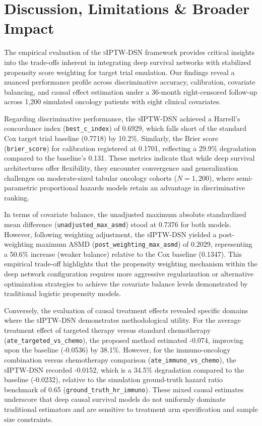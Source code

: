 \documentclass[10pt,twocolumn]{article}
\newenvironment{discussion}{\par\medskip}{\par\medskip}
\begin{document}
\section{Discussion, Limitations \& Broader Impact}
\begin{discussion}
The empirical evaluation of the \textsc{sIPTW-DSN} framework provides critical insights into the trade-offs inherent in integrating deep survival networks with stabilized propensity score weighting for target trial emulation. Our findings reveal a nuanced performance profile across discriminative accuracy, calibration, covariate balancing, and causal effect estimation under a 36-month right-censored follow-up across 1,200 simulated oncology patients with eight clinical covariates.

Regarding discriminative performance, the \textsc{sIPTW-DSN} achieved a Harrell's concordance index (\texttt{best\_c\_index}) of 0.6929, which falls short of the standard Cox target trial baseline (0.7718) by 10.2\%. Similarly, the Brier score (\texttt{brier\_score}) for calibration registered at 0.1701, reflecting a 29.9\% degradation compared to the baseline's 0.131. These metrics indicate that while deep survival architectures offer flexibility, they encounter convergence and generalization challenges on moderate-sized tabular oncology cohorts ($N = 1,200$), where semi-parametric proportional hazards models retain an advantage in discriminative ranking.

In terms of covariate balance, the unadjusted maximum absolute standardized mean difference (\texttt{unadjusted\_max\_asmd}) stood at 0.7376 for both models. However, following weighting adjustment, the \textsc{sIPTW-DSN} yielded a post-weighting maximum ASMD (\texttt{post\_weighting\_max\_asmd}) of 0.2029, representing a 50.6\% increase (weaker balance) relative to the Cox baseline (0.1347). This empirical trade-off highlights that the propensity weighting mechanism within the deep network configuration requires more aggressive regularization or alternative optimization strategies to achieve the covariate balance levels demonstrated by traditional logistic propensity models.

Conversely, the evaluation of causal treatment effects revealed specific domains where the \textsc{sIPTW-DSN} demonstrates methodological utility. For the average treatment effect of targeted therapy versus standard chemotherapy (\texttt{ate\_targeted\_vs\_chemo}), the proposed method estimated -0.074, improving upon the baseline (-0.0536) by 38.1\%. However, for the immuno-oncology combination versus chemotherapy comparison (\texttt{ate\_immuno\_vs\_chemo}), the \textsc{sIPTW-DSN} recorded -0.0152, which is a 34.5\% degradation compared to the baseline (-0.0232), relative to the simulation ground-truth hazard ratio benchmark of 0.65 (\texttt{ground\_truth\_hr\_immuno}). These mixed causal estimates underscore that deep causal survival models do not uniformly dominate traditional estimators and are sensitive to treatment arm specification and sample size constraints.
\end{discussion}
\end{document}
